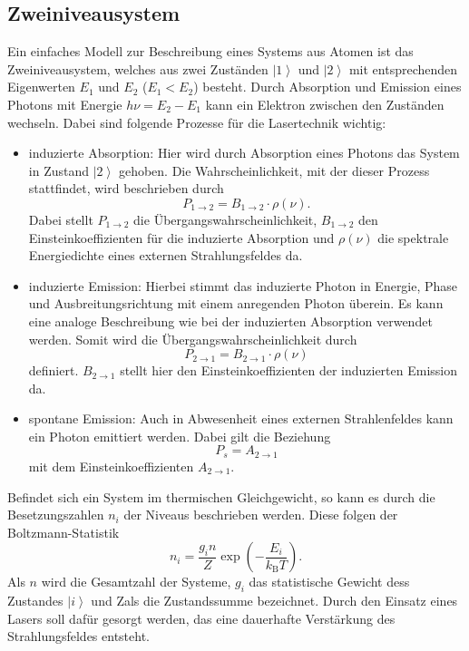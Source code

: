 \subsection{Zweiniveausystem}
Ein einfaches Modell zur Beschreibung eines Systems aus Atomen ist das Zweiniveausystem,
welches aus zwei Zuständen $\left| 1 \right>$ und $\left| 2 \right>$ mit entsprechenden
Eigenwerten $E_1$ und $E_2$ ($E_1<E_2$) besteht.
Durch Absorption und Emission eines Photons mit
Energie $h\nu=E_2-E_1$ kann ein Elektron zwischen den Zuständen wechseln.
Dabei sind folgende Prozesse für die Lasertechnik wichtig:
\begin{itemize}
  \item induzierte Absorption:
  Hier wird durch Absorption eines Photons das System in Zustand $\left| 2 \right>$
  gehoben. Die Wahrscheinlichkeit, mit der dieser Prozess stattfindet, wird beschrieben
  durch
  \begin{equation}
    P_{1\rightarrow 2} = B_{1\rightarrow 2}\cdot \rho(\nu).
  \end{equation}
  Dabei stellt $P_{1\rightarrow 2}$ die Übergangswahrscheinlichkeit, $B_{1\rightarrow 2}$ den
  Einsteinkoeffizienten für die induzierte Absorption und $\rho(\nu)$ die spektrale Energiedichte
  eines externen Strahlungsfeldes da.
  \item induzierte Emission:
  Hierbei stimmt das induzierte Photon in Energie, Phase und Ausbreitungsrichtung
  mit einem anregenden Photon überein. Es kann eine analoge Beschreibung wie bei der
  induzierten Absorption verwendet werden.
  Somit wird die Übergangswahrscheinlichkeit durch
  \begin{equation}
    P_{2\rightarrow 1} = B_{2\rightarrow 1}\cdot\rho(\nu)
  \end{equation}
  definiert. $B_{2\rightarrow 1}$ stellt hier den Einsteinkoeffizienten der induzierten
  Emission da.
  \item spontane Emission:
  Auch in Abwesenheit eines externen Strahlenfeldes kann ein Photon emittiert werden.
  Dabei gilt die Beziehung
  \begin{equation}
    P_s = A_{2\rightarrow 1}
  \end{equation}
  mit dem Einsteinkoeffizienten $A_{2\rightarrow 1}$.
\end{itemize}

Befindet sich ein System im thermischen Gleichgewicht, so kann es durch die
Besetzungszahlen $n_i$ der Niveaus beschrieben werden. Diese folgen der
Boltzmann-Statistik
\begin{equation}
    n_i = \frac{g_in}{Z}\exp\left(-\frac{E_i}{k_\text{B}T}\right).
\end{equation}
Als $n$ wird die Gesamtzahl der Systeme, $g_i$ das statistische Gewicht dess Zustandes
$\left| i \right>$ und Zals die Zustandssumme bezeichnet. Durch den Einsatz
eines Lasers soll dafür gesorgt werden, das eine dauerhafte Verstärkung des
Strahlungsfeldes entsteht.

